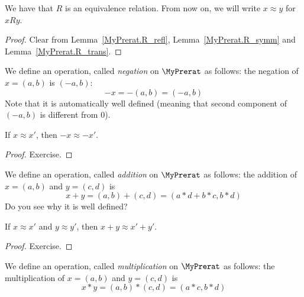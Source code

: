 \begin{lemma}
    \label{MyPrerat.R_equiv}
    \leanok
We have that $R$ is an equivalence relation. From now on, we will write $x \approx y$ for
$x R y$.
\end{lemma}
\begin{proof}
    \leanok
Clear from Lemma~\ref{MyPrerat.R_refl}, Lemma~\ref{MyPrerat.R_symm} and Lemma~\ref{MyPrerat.R_trans}.
\end{proof}

\begin{definition}
    \label{MyPrerat.neg}
    \leanok
We define an operation, called \emph{negation} on $\MyPrerat$ as follows: the negation of $x = (a,b)$ is
$(-a,b)$:
\[
-x = -(a,b) = (-a,b)
\]
Note that it is automatically well defined (meaning that second component of $(-a,b)$ is different from $0$).
\end{definition}

\begin{lemma}
    \label{MyPrerat.neg_quotient}
    \leanok
If $x \approx x'$, then $-x \approx -x'$.
\end{lemma}
\begin{proof}
\leanok
Exercise.
\end{proof}

\begin{definition}
    \label{MyPrerat.add}
    \leanok
We define an operation, called \emph{addition} on $\MyPrerat$ as follows: the addition of $x = (a,b)$
and $y = (c, d)$ is
\[
x + y = (a,b) + (c,d) = (a * d + b * c, b*d)
\]
Do you see why it is well defined?
\end{definition}

\begin{lemma}
    \label{MyPrerat.add_quotient}
    \leanok
If $x \approx x'$ and $y \approx y'$, then $x + y \approx x' + y'$.
\end{lemma}
\begin{proof}
\leanok
Exercise.
\end{proof}

\begin{definition}
    \label{MyPrerat.mul}
    \leanok
We define an operation, called \emph{multiplication} on $\MyPrerat$ as follows: the multiplication of $x = (a,b)$ and $y = (c, d)$ is
\[
x * y = (a,b) * (c,d) = (a*c, b*d)
\]
\end{definition}

